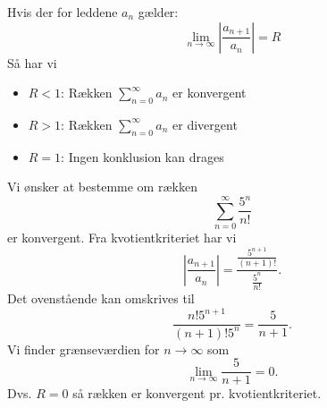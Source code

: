 \begin{sæt} [Kvotientkriteriet]
  Hvis der for leddene $a_n$ gælder:
  \[ 
  \lim_{n \to \infty} \left| \frac{a_{n+1}}{a_n} \right| = R
  \]
  Så har vi
  \begin{itemize}
    \item $R < 1$: Rækken $\sum_{n = 0}^{\infty} a_n$ er konvergent
    \item $R> 1$: Rækken $\sum_{n = 0}^{\infty} a_n$ er divergent
    \item $R = 1$: Ingen konklusion kan drages
  \end{itemize}
\end{sæt}

\begin{eks} 
  Vi ønsker at bestemme om rækken
  \[ 
  \sum_{n = 0}^{\infty} \frac{5^{n}}{n!}
  \]
  er konvergent.
  \bigbreak
  Fra kvotientkriteriet har vi
  \[ 
  \left| \frac{a_{n+1}}{a_n} \right| = \frac{ \frac{5^{n+1}}{(n+1)!}}{\frac{5^{n}}{n!}}
  .\]
  Det ovenstående kan omskrives til
  \[ 
  \frac{n! 5^{n+1}}{(n+1)! 5^{n}} = \frac{5}{n+1}
  .\]
  Vi finder grænseværdien for $n \to \infty$ som
  \[ 
  \lim_{n \to \infty} \frac{5}{n+1} = 0
  .\]
  Dvs. $R = 0$ så rækken er konvergent pr. kvotientkriteriet.
\end{eks}
